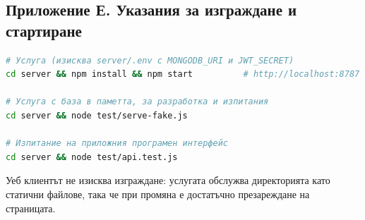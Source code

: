 \subsection*{Приложение Е. Указания за изграждане и стартиране}

\begin{lstlisting}[language=bash,caption={Стартиране на услугата и изпитанията},label={lst:run}]
# Услуга (изисква server/.env с MONGODB_URI и JWT_SECRET)
cd server && npm install && npm start          # http://localhost:8787

# Услуга с база в паметта, за разработка и изпитания
cd server && node test/serve-fake.js

# Изпитание на приложния програмен интерфейс
cd server && node test/api.test.js
\end{lstlisting}

Уеб клиентът не изисква изграждане: услугата обслужва директорията 
като статични файлове, така че при промяна е достатъчно презареждане на страницата.
